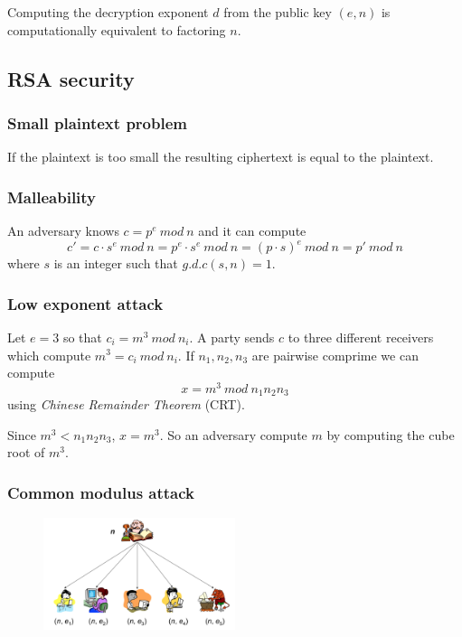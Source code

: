 \documentclass[a4paper,12pt]{article}
\begin{document}
Computing the decryption exponent $d$ from the public key $(e, n)$ is computationally equivalent to factoring $n$.

\subsection{RSA security}
\subsubsection{Small plaintext problem}
If the plaintext is too small the resulting ciphertext is equal to the plaintext.

\subsubsection{Malleability}
An adversary knows $c = p^e\ mod\ n$ and it can compute
$$ c' = c \cdot s^e\ mod\ n = p^e \cdot s^e\ mod\ n = (p \cdot s)^e\ mod\ n = p'\ mod\ n $$
where $s$ is an integer such that $g.d.c(s, n) = 1$.

\subsubsection{Low exponent attack}
Let $e = 3$ so that $c_i = m^3\ mod\ n_i$.
A party sends $c$ to three different receivers which compute $m^3 = c_i\ mod\ n_i$.
If $n_1, n_2, n_3$ are pairwise comprime we can compute 
$$ x = m^3\ mod\ n_1n_2n_3$$ 
using \textit{Chinese Remainder Theorem} (CRT).

Since $m^3 < n_1n_2n_3$, $x = m^3$. So an adversary compute $m$ by computing the cube root of $m^3$.

\subsubsection{Common modulus attack}

\begin{figure}[H]
  \centering
  \includegraphics[width=0.5\textwidth]{img/common-modulus-attack}
\end{figure}
\end{document}
